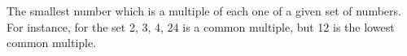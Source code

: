 The smallest number which is a multiple of each one
of a given set of numbers. For instance, for the set
{2, 3, 4}, 24 is a common multiple, but 12 is the lowest
common multiple.